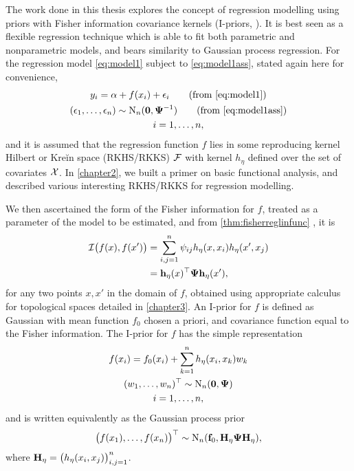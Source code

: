 \documentclass[showframe,11pt,twoside,openright]{report}
\begin{document}
\thispagestyle{chapterseven}

The work done in this thesis explores the concept of regression modelling using priors with Fisher information covariance kernels (I-priors, \cite{bergsma2017}).
It is best seen as a flexible regression technique which is able to fit both parametric and nonparametric models, and bears similarity to Gaussian process regression.
For the regression model \cref{eq:model1} subject to \cref{eq:model1ass}, stated again here for convenience,
\begin{gather}
  y_i = \alpha + f(x_i) + \epsilon_i \tag{from \ref{eq:model1}} \\
  (\epsilon_1,\dots,\epsilon_n) \sim \N_n(\bzero,\bPsi^{-1}) \tag{from \ref{eq:model1ass}} \\
  i = 1,\dots,n, \nonumber
\end{gather}
and it is assumed that the regression function $f$ lies in some reproducing kernel Hilbert or Kreĭn space (RKHS/RKKS) ${\mathcal F}$ with kernel $h_\eta$ defined over the set of covariates ${\mathcal X}$.
In \cref{chapter2}, we built a primer on basic functional analysis, and described various interesting RKHS/RKKS for regression modelling.

We then ascertained the form of the Fisher information for $f$, treated as a parameter of the model to be estimated, and from \cref{thm:fisherreglinfunc} , it is
\begin{align*}
  {\mathcal I}\big(f(x),f(x') \big) 
  &= \sum_{i,j=1}^n \psi_{ij} h_\eta(x,x_i) h_\eta(x',x_j) \\
  &= {\mathbf h}_\eta(x)^\top{\bm\Psi}{\mathbf h}_\eta(x'), 
\end{align*}
for any two points $x,x'$ in the domain of $f$, obtained using appropriate calculus for topological spaces detailed in \cref{chapter3}.
An I-prior for $f$ is defined as Gaussian with mean function $f_0$ chosen a priori, and covariance function equal to the Fisher information.
The I-prior for $f$ has the simple representation
\begin{gather*}
  f(x_i) = f_0(x_i) + \sum_{k=1}^n h_\eta(x_i,x_k)w_k \\
  (w_1,\dots,w_n)^\top \sim \operatorname{N}_n({\mathbf 0},{\bm\Psi}) \\
  i=1,\dots,n,
\end{gather*}
and is written equivalently as the Gaussian process prior
\begin{equation*}
  \big(f(x_1),\dots,f(x_n) \big)^\top \sim \operatorname{N}_n({\mathbf f}_0, {\mathbf H}_\eta{\bm\Psi}{\mathbf H}_\eta),
\end{equation*}
where ${\mathbf H}_\eta=\big( h_\eta(x_i,x_j) \big)_{i,j=1}^n$.
\end{document}

